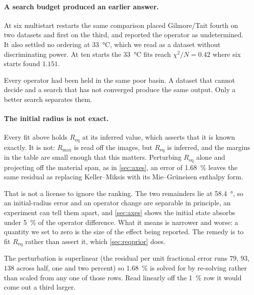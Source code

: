 \documentclass[10pt]{article}
\begin{document}
\paragraph{A search budget produced an earlier answer.} At six multistart restarts the same
comparison placed Gilmore/Tait fourth on two datasets and first on the third, and reported the
operator as undetermined. It also settled no ordering at \SI{33}{\celsius}, which we read as a
dataset without discriminating power. At ten starts the \SI{33}{\celsius} fits reach
$\chi^2/N = 0.42$ where six starts found $1.151$.

Every operator had been held in the same poor basin. A dataset that cannot decide and a search
that has not converged produce the same output. Only a better search separates them.

\paragraph{The initial radius is not exact.} Every fit above holds $R_{\mathrm{eq}}$ at its
inferred value, which asserts that it is known exactly. It is not: $R_{\max}$ is read off the
images, but $R_{\mathrm{eq}}$ is inferred, and the margins in the table are small enough that
this matters. Perturbing $R_{\mathrm{eq}}$ alone and projecting off the material span, as in
\cref{sec:axes}, an error of \SI{1.68}{\percent} leaves the same residual as replacing
Keller--Miksis with its Mie--Gr\"uneisen enthalpy form.

That is not a license to ignore the ranking. The two remainders lie at
\SI{58.4}{\degree}, so an initial-radius error and an operator change are separable in
principle, an experiment can tell them apart, and \cref{sec:axes} shows the initial state
absorbs under \SI{5}{\percent} of the operator difference. What it means is narrower and
worse: a quantity we set to zero is the size of the effect being reported. The remedy is to
fit $R_{\mathrm{eq}}$ rather than assert it, which \cref{sec:reqprior} does.

The perturbation is superlinear (the residual per unit fractional error runs $79$, $93$,
$138$ across half, one and two percent) so \SI{1.68}{\percent} is solved for by re-solving
rather than scaled from any one of those rows. Read linearly off the \SI{1}{\percent} row it
would come out a third larger.
\end{document}
